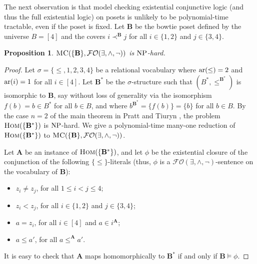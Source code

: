 \documentclass[usletter]{article}
\newcommand{\longversion}[1]{#1}
\newcommand{\shortversion}[1]{}
\newcommand{\longshort}[2]{\longversion{#1}\shortversion{#2}}
\newtheorem{proposition}{Proposition}
\begin{document}
The next observation is that model checking existential conjunctive logic 
(and thus the full existential logic) on posets is unlikely to be polynomial-time tractable, 
even if the poset is fixed.  Let $\mathbf{B}$ be the bowtie poset 
defined by the universe $B=[4]$ 
and the covers $i \prec^\mathbf{B} j$ for all $i \in \{1,2\}$ and $j \in \{3,4\}$.  


\longshort{\begin{proposition}}{\begin{proposition}[$\star$]}
\label{pr:exprcomplex}
$\textsc{MC}(\{\mathbf{B}\},\mathcal{FO}(\exists,\wedge,\neg))$ is $\textup{NP}$-hard.
\end{proposition}

\newcommand{\pfexprcomplex}[0]{
\begin{proof}
Let $\sigma=\{\leq,1,2,3,4\}$ be a relational vocabulary where 
$\textup{ar}(\leq)=2$ and $\textup{ar}(i)=1$ for all $i \in [4]$.  
Let $\mathbf{B}^*$ be the $\sigma$-structure 
such that $(B^*,\leq^{\mathbf{B}^*})$ is isomorphic to $\mathbf{B}$, 
say without loss of generality via the isomorphism $f(b)=b \in B^*$ for all $b \in B$, 
and where $b^{\mathbf{B}^*}=\{f(b)\}=\{b\}$ for all $b \in B$.  
By the case $n=2$ of the main theorem in Pratt and Tiuryn \cite[Theorem~2]{PrattTiuryn96}, 
the problem $\textsc{Hom}(\{\mathbf{B}^*\})$ is $\textup{NP}$-hard.  
We give a polynomial-time many-one reduction of $\textsc{Hom}(\{\mathbf{B}^*\})$ 
to $\textsc{MC}(\{\mathbf{B}\},\mathcal{FO}(\exists,\wedge,\neg))$.  

Let $\mathbf{A}$ be an instance of $\textsc{Hom}(\{\mathbf{B}^*\})$, 
and let $\phi$ be the existential closure of the conjunction of the following 
$\{\leq\}$-literals (thus, $\phi$ is a $\mathcal{FO}(\exists,\wedge,\neg)$-sentence 
on the vocabulary of $\mathbf{B}$):
\begin{itemize}
\item $z_i \neq z_j$, for all $1 \leq i<j\leq 4$;
\item $z_i<z_j$, for all $i \in \{1,2\}$ and $j \in \{3,4\}$;
\item $a=z_i$, for all $i \in [4]$ and $a \in i^\mathbf{A}$;
\item $a \leq a'$, for all $a \leq^{\mathbf{A}} a'$.  
\end{itemize}
It is easy to check that $\mathbf{A}$ maps homomorphically to 
$\mathbf{B}^*$ if and only if $\mathbf{B} \models \phi$.
\end{proof}
}
\longversion{\pfexprcomplex}
\end{document}

